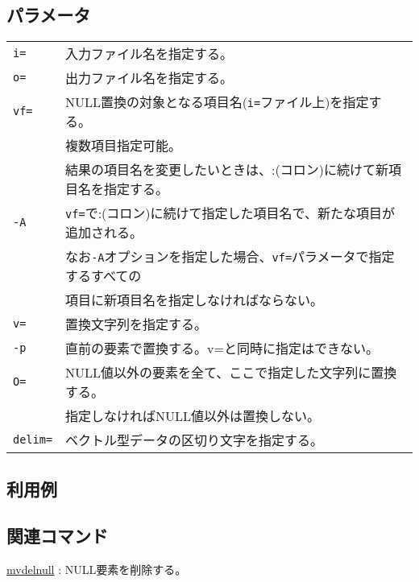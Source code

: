 \subsection*{パラメータ}
\begin{table}[htbp]
{\small
\begin{tabular}{ll}
\verb|i=|    & 入力ファイル名を指定する。\\
\verb|o=|    & 出力ファイル名を指定する。\\
\verb|vf=| & NULL置換の対象となる項目名(\verb|i=|ファイル上)を指定する。\\
           & 複数項目指定可能。\\
		   & 結果の項目名を変更したいときは、:(コロン)に続けて新項目名を指定する。\\
\verb|-A|  & \verb|vf=|で:(コロン)に続けて指定した項目名で、新たな項目が追加される。\\
           & なお\verb|-A|オプションを指定した場合、\verb|vf=|パラメータで指定するすべての\\
           & 項目に新項目名を指定しなければならない。\\
\verb|v=|  & 置換文字列を指定する。\\
\verb|-p|  & 直前の要素で置換する。v=と同時に指定はできない。\\
\verb|O=|  & NULL値以外の要素を全て、ここで指定した文字列に置換する。\\
           & 指定しなければNULL値以外は置換しない。\\
\verb|delim=| & ベクトル型データの区切り文字を指定する。\\
\end{tabular}
}
\end{table} 

\subsection*{利用例}


\subsection*{関連コマンド}
\hyperref[sect:mvdelnull]{mvdelnull} : NULL要素を削除する。

%
